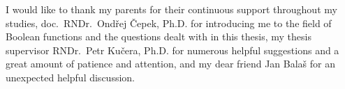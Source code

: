 I would like to thank
my parents for their continuous support throughout my studies,
\foreignlanguage{czech}{doc.~RNDr.~Ondřej Čepek, Ph.D.} for introducing me to the field of Boolean functions
and the questions dealt with in this thesis,
my thesis supervisor \mbox{RNDr.}~Petr Kučera, Ph.D.
for numerous helpful suggestions
and a great amount of patience and attention,
and my dear friend \foreignlanguage{czech}{Jan Balaš}
for an unexpected helpful discussion.